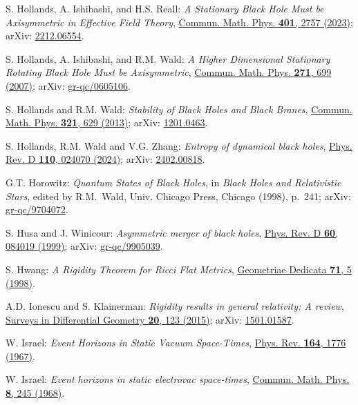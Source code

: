 \begin{thebibliography}{123}
S. Hollands, A. Ishibashi, and H.S. Reall:
{\em A Stationary Black Hole Must be Axisymmetric in Effective Field Theory},
\href{https://doi.org/10.1007/s00220-023-04700-1}{Commun. Math. Phys. {\bf 401}, 2757 (2023)};
arXiv: \href{https://arxiv.org/abs/2212.06554}{2212.06554}.

S. Hollands, A. Ishibashi, and R.M. Wald:
{\em A Higher Dimensional Stationary Rotating Black Hole Must be Axisymmetric},
\href{https://doi.org/10.1007/s00220-007-0216-4}{Commun. Math. Phys. {\bf 271}, 699 (2007)};
arXiv: \href{https://arxiv.org/abs/gr-qc/0605106}{gr-qc/0605106}.

S. Hollands and R.M. Wald:
{\em Stability of Black Holes and Black Branes},
\href{https://doi.org/10.1007/s00220-012-1638-1}{Commun. Math. Phys. {\bf 321}, 629 (2013)};
arXiv: \href{https://arxiv.org/abs/1201.0463}{1201.0463}.

S. Hollands, R.M. Wald and V.G. Zhang:
{\em Entropy of dynamical black holes},
\href{https://doi.org/10.1103/PhysRevD.110.024070}{Phys. Rev. D {\bf 110}, 024070 (2024)};
arXiv: \href{https://arxiv.org/abs/2402.00818}{2402.00818}.

G.T. Horowitz:
{\em Quantum States of Black Holes},
in {\em Black Holes and Relativistic Stars}, edited by R.M.~Wald,
Univ. Chicago Press, Chicago (1998), p.~241;
arXiv: \href{https://arxiv.org/abs/gr-qc/9704072}{gr-qc/9704072}.

S. Husa and J. Winicour:
{\em Asymmetric merger of black holes},
\href{https://doi.org/10.1103/PhysRevD.60.084019}{Phys. Rev. D {\bf 60}, 084019 (1999)};
arXiv: \href{https://arxiv.org/abs/gr-qc/9905039}{gr-qc/9905039}.

S. Hwang:
{\em A Rigidity Theorem for Ricci Flat Metrics},
\href{https://doi.org/10.1023/A:1005094911005}{Geometriae Dedicata {\bf 71}, 5 (1998)}.

A.D. Ionescu and S. Klainerman:
{\em Rigidity results in general relativity: A review},
\href{https://dx.doi.org/10.4310/SDG.2015.v20.n1.a6}{Surveys in Differential Geometry {\bf 20}, 123 (2015)};
arXiv: \href{https://arxiv.org/abs/1501.01587}{1501.01587}.

W. Israel: {\em Event Horizons in Static Vacuum Space-Times},
\href{https://doi.org/10.1103/PhysRev.164.1776}{Phys. Rev. {\bf 164}, 1776 (1967)}.

W. Israel: {\em Event horizons in static electrovac space-times},
\href{https://doi.org/10.1007/BF01645859}{Commun. Math. Phys. {\bf 8}, 245 (1968)}.


\end{thebibliography}
